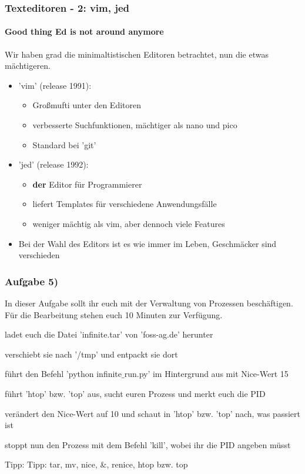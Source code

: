 \documentclass[12pt,utf8]{beamer}
\begin{document}
\begin{frame}
\frametitle{Texteditoren - 2: vim, jed}
\framesubtitle{Good thing Ed is not around anymore}
Wir haben grad die minimaltistischen Editoren betrachtet, nun die etwas mächtigeren.
\begin{itemize}
	\item 'vim' (release 1991):
	\begin{itemize}[<+->]
		\item Großmufti unter den Editoren
		\item verbesserte Suchfunktionen, mächtiger als nano und pico
		\item Standard bei 'git'
	\end{itemize}
	\item 'jed' (release 1992):
	\begin{itemize}[<+->]
		\item \textbf{der} Editor für Programmierer
		\item liefert Templates für verschiedene Anwendungsfälle
		\item weniger mächtig als vim, aber dennoch viele Features
	\end{itemize}
	\item Bei der Wahl des Editors ist es wie immer im Leben, Geschmäcker sind verschieden
\end{itemize}
\end{frame}

\begin{frame}
\frametitle{Aufgabe 5)}
In dieser Aufgabe sollt ihr euch mit der Verwaltung von Prozessen beschäftigen.
Für die Bearbeitung stehen euch 10 Minuten zur Verfügung.
\begin{itemize}
	{\footnotesize
	\item ladet euch die Datei 'infinite.tar' von 'foss-ag.de' herunter
	\item verschiebt sie nach '/tmp' und entpackt sie dort
	\item führt den Befehl 'python infinite$\_$run.py' im Hintergrund aus mit Nice-Wert 15
	\item führt 'htop' bzw. 'top' aus, sucht euren Prozess und merkt euch die PID
	\item verändert den Nice-Wert auf 10 und schaut in 'htop' bzw. 'top' nach, was passiert ist
	\item stoppt nun den Prozess mit dem Befehl 'kill', wobei ihr die PID angeben müsst
	}
\end{itemize}
{\scriptsize Tipp:  Tipp: tar, mv, nice, \&, renice, htop bzw. top}
\end{frame}
\end{document}
